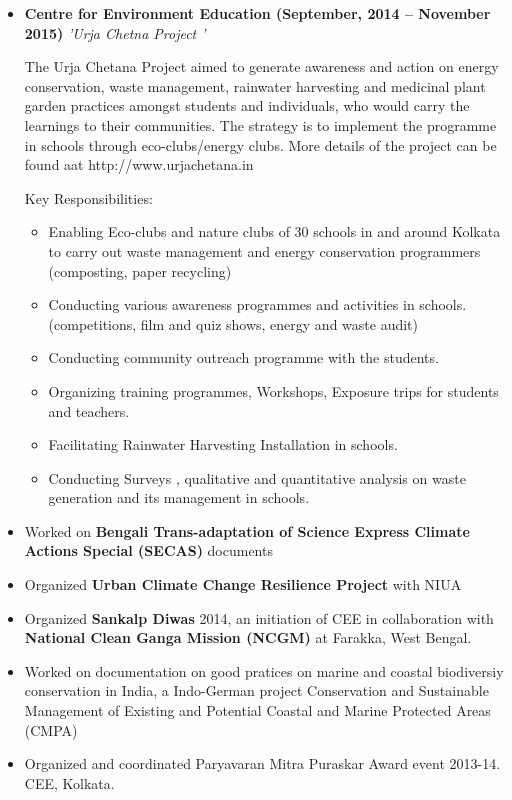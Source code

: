 \documentclass[11pt,a4paper,sans]{moderncv}
\begin{document}
\begin{itemize}
      \newpage
\item{\textbf{Centre for Environment Education (September, 2014 – November 2015)} \textit{'Urja Chetna Project '}

\vspace{3pt}

\small{ The Urja Chetana Project aimed to generate awareness and action on energy conservation, waste management, rainwater harvesting and medicinal
plant garden practices amongst students and individuals, who would carry the learnings to their communities.
The strategy is to implement the programme in schools through eco-clubs/energy clubs.
More details of the project can be found aat http://www.urjachetana.in }}
Key Responsibilities:
\begin{itemize}
\item Enabling Eco-clubs and nature clubs of 30 schools in and around Kolkata to carry out waste management and energy conservation programmers (composting, paper recycling)
\item Conducting various awareness programmes and activities in schools. (competitions, film and quiz shows, energy and waste audit)
\item Conducting community outreach programme with the students.
\item Organizing training programmes, Workshops, Exposure trips for students and teachers.
\item Facilitating Rainwater Harvesting Installation in schools.
\item Conducting Surveys , qualitative and quantitative analysis on waste generation and its management in schools.
\end{itemize}

\vspace{3pt}
\item Worked on \textbf{Bengali Trans-adaptation of Science Express Climate Actions Special (SECAS)} documents
\item Organized \textbf{Urban Climate Change Resilience Project} with NIUA
\item Organized \textbf{Sankalp Diwas} 2014, an initiation of CEE in collaboration with \textbf{National Clean Ganga Mission (NCGM)} at Farakka, West Bengal.
\item Worked on documentation on good pratices on marine and coastal biodiversiy conservation in India, a Indo-German project Conservation and Sustainable Management of Existing and
Potential Coastal and Marine Protected Areas (CMPA)
\item Organized and coordinated Paryavaran Mitra Puraskar Award event 2013-14. CEE, Kolkata.
\end{itemize}
\end{document}
